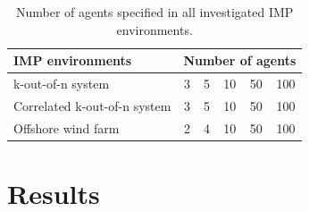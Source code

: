 \begin{table}[t]
  \caption{Number of agents specified in all investigated IMP environments.}
    \label{tab:experiments_details}
  \centering
    \begin{tabular}{lccccc}
    \toprule
    IMP environments & \multicolumn{5}{l}{Number of agents}  \\
     \midrule
    k-out-of-n system & 3 & 5 & 10 & 50 & 100 \\
     Correlated k-out-of-n system & 3 & 5 & 10 & 50 & 100 \\
     Offshore wind farm & 2 & 4 & 10 & 50 & 100  \\
    \bottomrule
    \end{tabular}
\end{table}

\newpage

\section{Results}\label{sec:ch5_results}

